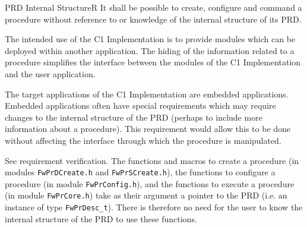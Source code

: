 \documentclass[requirements]{../fwprofile}
\begin{document}
\begin{fw_req}{PRD Internal Structure}{R}
{It shall be possible to create, configure and command a procedure
 without reference to or knowledge of the internal structure of its PRD.}
{The intended use of the C1 Implementation is to provide modules 
which can be deployed within another application. 
The hiding of the information related to a procedure simplifies the interface between 
the modules of the C1 Implementation and the user application.

The target applications of the C1 Implementation are embedded applications. 
Embedded applications often have special requirements which may require changes to the internal 
structure of the PRD (perhaps to include more information about a procedure). 
This requirement would allow this to be done without affecting the interface through which 
the procedure is manipulated.} 
{See requirement verification.} 
{The functions and macros to create a procedure 
(in modules \texttt{FwPrDCreate.h} and \texttt{FwPrSCreate.h}), 
the functions to configure a procedure (in module \texttt{FwPrConfig.h}), and the 
functions to execute a procedure (in module \texttt{FwPrCore.h}) 
take as their argument a pointer to the PRD (i.e. an instance of type \texttt{FwPrDesc\_t}). 
There is therefore no need for the user to know the internal structure of the PRD to use these functions.}
\end{fw_req}
\end{document}
